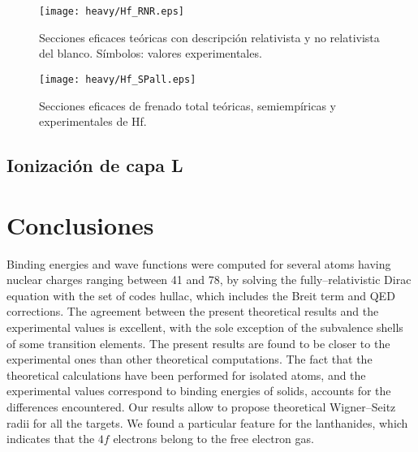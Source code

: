 \begin{figure}[H]
\centering
\texttt{[image: heavy/Hf\_RNR.eps]}
\caption[Secciones eficaces relativistas y no relativistas de Hf.]
{Secciones eficaces teóricas con descripción relativista y no relativista
del blanco. Símbolos: valores experimentales.}
\label{fig:Hf_SP}
\end{figure}

\begin{figure}[H]
\centering
\texttt{[image: heavy/Hf\_SPall.eps]}
\caption[Secciones eficaces teóricas, semiempíricas y experimentales de Hf.]{Secciones eficaces de frenado total teóricas, semiempíricas y
experimentales de Hf.}
\label{fig:Hf_SP}
\end{figure}


\subsection{Ionización de capa L}
\label{subsec:results-ionLshell}

\section{Conclusiones}
\label{sec:conclu-heavy}

Binding energies and wave functions were computed for several atoms
having nuclear charges ranging between 41 and 78, by solving the
fully--relativistic Dirac equation with the set of codes {\sc hullac}, 
which includes the Breit term and QED corrections. The agreement between 
the present theoretical results and the experimental values is excellent,
with the sole exception of the subvalence shells of some transition
elements. The present results are found to be closer to the experimental 
ones than other theoretical computations. 
The fact that the theoretical calculations have been performed
for isolated atoms, and
the experimental values correspond to binding energies of solids,
accounts for the differences encountered. 
Our results allow to propose theoretical Wigner--Seitz radii for all 
the targets. We found a particular feature for the lanthanides, which
indicates that the $4f$ electrons belong to the free electron gas.


